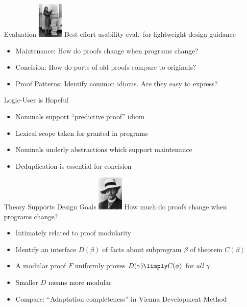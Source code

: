 \documentclass[slidestop,aspectratio=169]{beamer}
\newcommand{\logician}[1][1in]{\includegraphics[width=#1]{img/hilbert.png}}
\newcommand{\logicuser}[1][1in]{\includegraphics[width=#1]{img/hamilton.png}}
\theoremstyle{plain}
\theoremstyle{definition}
\theoremstyle{remark}
\begin{document}
\begin{frame}[t]{Evaluation}
\logicuser[0.5in] 
Best-effort usability eval.\ for lightweight design guidance
\begin{itemize}
\item Maintenance: How do proofs change when programs change?
\item Concision: How do ports of old proofs compare to originals?
\item Proof Patterns: Identify common idioms. Are they easy to express?
\end{itemize}
\end{frame}

\begin{frame}[t]{Logic-User is Hopeful}
  \begin{itemize}
  \item Nominals support ``predictive proof'' idiom
  \item Lexical scope taken for granted in programs
  \item Nominals underly abstractions which support maintenance
  \item Deduplication is essential for concision
  \end{itemize}
\end{frame}

\begin{frame}[t]{Theory Supports Design Goals}
\logician[0.5in]
How much do proofs change when programs change?
\begin{itemize}
\item Intimately related to proof modularity
\item Identify an interface $D(\beta)$ of facts about subprogram $\beta$ of theorem $C(\beta)$
\item A modular proof $F$ uniformly proves $D(\gamma) \limply C(\phi)$ for \emph{all} $\gamma$
\item Smaller $D$ means more modular
\item Compare: ``Adaptation completeness'' in Vienna Development Method
\end{itemize}
\end{frame}
\end{document}
